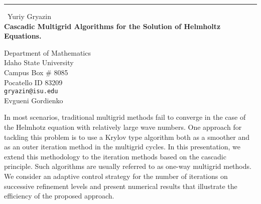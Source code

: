 \documentclass{report}
\begin{document}
\begin{center}
\rule{6in}{1pt} \
{\large Yuriy Gryazin \\
{\bf Cascadic Multigrid Algorithms for the Solution of Helmholtz Equations.}}

Department of Mathematics \\ Idaho State University \\ Campus Box # 8085 \\ Pocatello ID 83209
\\
{\tt gryazin@isu.edu}\\
Evgueni  Gordienko\end{center}

In most scenarios, traditional multigrid methods fail to converge in the
case of the Helmhotz equation with relatively large wave numbers. One
approach for tackling this problem is to use a Krylov type algorithm both
as a smoother and as an outer iteration method in the multigrid cycles.
In this presentation, we extend this methodology to the iteration methods
based on the cascadic principle. Such algorithms are usually referred to
as one-way multigrid methods. We consider an adaptive control strategy
for the number of iterations on successive refinement levels and present
numerical results that illustrate the efficiency of the proposed
approach.
\end{document}

